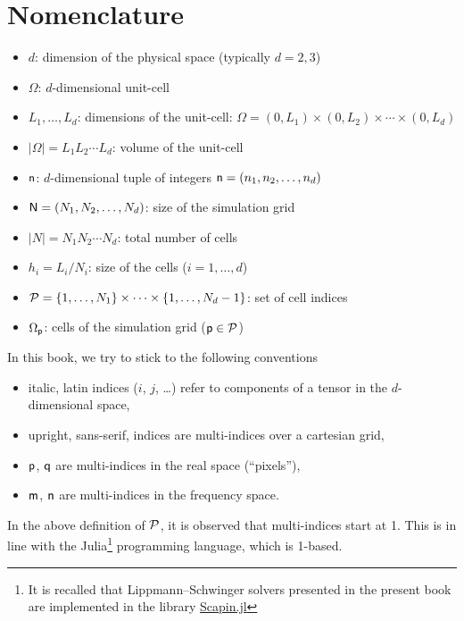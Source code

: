 \chapter{Nomenclature}
\label{cha:20210924084856}

\begin{itemize}
\item \(d\): dimension of the physical space (typically \(d=2, 3\))
\item \(\Omega\): \(d\)-dimensional unit-cell
\item \(L_1,\ldots, L_d\): dimensions of the unit-cell:
  \(\Omega=(0, L_1)\times(0, L_2)\times\cdots\times(0, L_d)\)
\item \(\lvert\Omega\rvert=L_1L_2\cdots L_d\): volume of the unit-cell
\item \(\mathsf{n}\): \(d\)-dimensional tuple of integers
  \(\mathsf{n}=(n_1, n_2, \ldots, n_d)\)
\item \(\mathsf{N}=(N_1, N_2, \ldots, N_d)\): size of the simulation grid
\item \(\lvert N\rvert=N_1N_2\cdots N_d\): total number of cells
\item \(h_i=L_i/N_i\): size of the cells (\(i=1, \ldots, d\))
\item \(\mathcal{P}=\{1, \ldots, N_1\}\times\cdots\times\{1, \ldots, N_d-1\}\):
  set of cell indices
\item \(\Omega_{\mathsf{p}}\): cells of the simulation grid
  (\(\mathsf{p}\in\mathcal{P}\))
\end{itemize}

\begin{remark}
  \label{rem:20210924090334}
  In this book, we try to stick to the following conventions
  \begin{itemize}
  \item italic, latin indices (\(i\), \(j\), \ldots) refer to components of a
    tensor in the \(d\)-dimensional space,
  \item upright, sans-serif, indices are multi-indices over a cartesian grid,
  \item \(\mathsf{p}\), \(\mathsf{q}\) are multi-indices in the real space
    (``pixels''),
  \item \(\mathsf{m}\), \(\mathsf{n}\) are multi-indices in the frequency space.
  \end{itemize}
\end{remark}

\begin{remark}
  \label{rem:20210924090344}
  In the above definition of \(\mathcal{P}\), it is observed that multi-indices
  start at 1. This is in line with the Julia\footnote{It is recalled that
    Lippmann--Schwinger solvers presented in the present book are implemented in
    the library \href{https://github.com/sbrisard/Scapin.jl}{Scapin.jl}}
  programming language, which is 1-based.
\end{remark}
